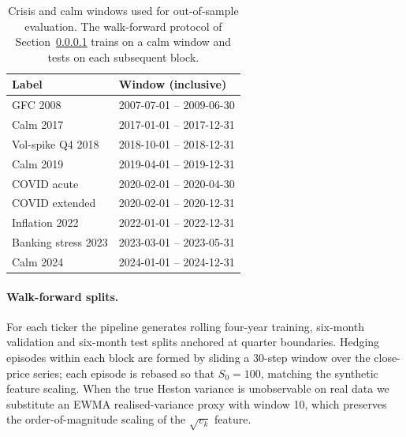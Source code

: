 \documentclass[11pt,oneside]{report}
\begin{document}
\begin{table}[H]
\centering\small
\caption{Crisis and calm windows used for out-of-sample evaluation. The walk-forward protocol of Section~\ref{sec:walkforward} trains on a calm window and tests on each subsequent block.}
\label{tab:crisis_windows}
\begin{tabular}{@{}ll@{}}
\toprule
\textbf{Label} & \textbf{Window (inclusive)} \\\midrule
GFC 2008             & 2007-07-01 -- 2009-06-30 \\
Calm 2017            & 2017-01-01 -- 2017-12-31 \\
Vol-spike Q4 2018    & 2018-10-01 -- 2018-12-31 \\
Calm 2019            & 2019-04-01 -- 2019-12-31 \\
COVID acute          & 2020-02-01 -- 2020-04-30 \\
COVID extended       & 2020-02-01 -- 2020-12-31 \\
Inflation 2022       & 2022-01-01 -- 2022-12-31 \\
Banking stress 2023  & 2023-03-01 -- 2023-05-31 \\
Calm 2024            & 2024-01-01 -- 2024-12-31 \\
\bottomrule
\end{tabular}
\end{table}

\paragraph{Walk-forward splits.}\label{sec:walkforward}
For each ticker the pipeline generates rolling four-year training, six-month validation and six-month test splits anchored at quarter boundaries.  Hedging episodes within each block are formed by sliding a 30-step window over the close-price series; each episode is rebased so that $S_0=100$, matching the synthetic feature scaling.  When the true Heston variance is unobservable on real data we substitute an EWMA realised-variance proxy with window 10, which preserves the order-of-magnitude scaling of the $\sqrt{v_k}$ feature.
\end{document}
